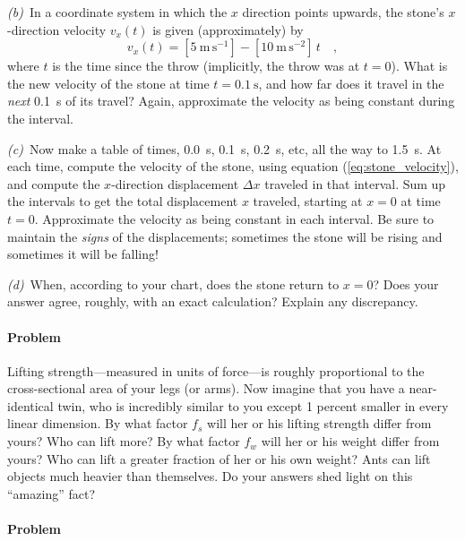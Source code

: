 \documentclass[12pt]{article}
\newcounter{problem}
\begin{document}
\textsl{(b)}~In a coordinate system in which the $x$ direction points
upwards, the stone's $x$-direction velocity $v_x(t)$ is given
(approximately) by
\begin{equation}
v_x(t)= [5~\mathrm{m\,s^{-1}}]-[10~\mathrm{m\,s^{-2}}]\,t \quad ,
\label{eq:stone_velocity}
\end{equation}
where $t$ is the time since the throw (implicitly, the throw was at
$t=0$).  What is the new velocity of the stone at time
$t=0.1~\mathrm{s}$, and how far does it travel in the \emph{next}
0.1~s of its travel?  Again, approximate the velocity as being
constant during the interval.

\textsl{(c)}~Now make a table of times, 0.0~s, 0.1~s, 0.2~s, etc, all
the way to 1.5~s.  At each time, compute the velocity of the stone,
using equation (\ref{eq:stone_velocity}), and compute the
$x$-direction displacement $\Delta x$ traveled in that interval.  Sum
up the intervals to get the total displacement $x$ traveled, starting
at $x=0$ at time $t=0$.  Approximate the velocity as being constant in
each interval.  Be sure to maintain the \emph{signs} of the
displacements; sometimes the stone will be rising and sometimes it
will be falling!

\textsl{(d)}~When, according to your chart, does the stone return to
$x=0$?  Does your answer agree, roughly, with an exact calculation?
Explain any discrepancy.

\paragraph{Problem~\theproblem}

Lifting strength---measured in units of force---is roughly
proportional to the cross-sectional area of your legs (or arms).  Now
imagine that you have a near-identical twin, who is incredibly similar
to you except 1 percent smaller in every linear dimension.  By what
factor $f_s$ will her or his lifting strength differ from yours?  Who
can lift more?  By what factor $f_w$ will her or his weight differ
from yours?  Who can lift a greater fraction of her or his own weight?
Ants can lift objects much heavier than themselves.  Do your answers
shed light on this ``amazing'' fact?

\paragraph{Problem~\theproblem}
\end{document}
